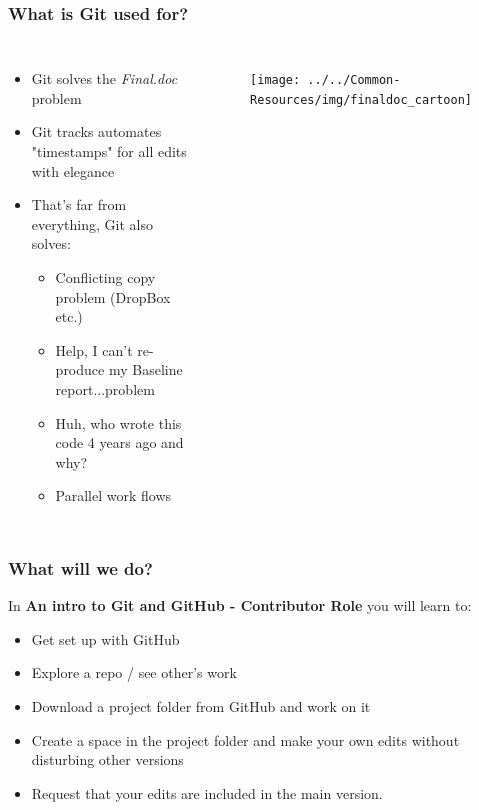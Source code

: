 \documentclass[aspectratio=169]{beamer} %
\begin{document}
\begin{frame}
\frametitle{What is Git used for?}

	\begin{columns}[c]

		\begin{itemize}
			\item Git solves the \textit{Final.doc} problem
			\item Git tracks automates "timestamps" for all edits with elegance
			\item That's far from everything, Git also solves:
			\begin{itemize}
				\item <2->Conflicting copy problem (DropBox etc.)
				\item <2->Help, I can't re-produce my Baseline report...problem
				\item <2->Huh, who wrote this code 4 years ago and why?
				\item <2->Parallel work flows
			\end{itemize}
		\end{itemize}

		\begin{figure}
			\centering
			\texttt{[image: ../../Common-Resources/img/finaldoc\_cartoon]}
			\label{fig:finaldoccartoon}
		\end{figure}

	\end{columns}
\end{frame}




\begin{frame}
\frametitle{What will we do?}

	In \textbf{An intro to Git and GitHub - Contributor Role} you will learn to:

	\begin{itemize}
		\item Get set up with GitHub
		\item Explore a repo / see other's work
		\item Download a project folder from GitHub and work on it
		\item Create a space in the project folder and make your own edits without disturbing other versions
		\item Request that your edits are included in the main version.
	\end{itemize}

\end{frame}
\end{document}
